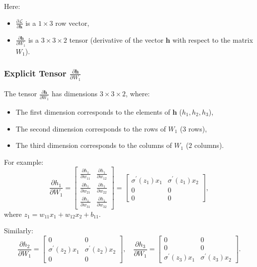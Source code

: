 \begin{notechapter}
Here:
\begin{itemize}
    \item \( \frac{\partial \mathcal{L}}{\partial \mathbf{h}} \) is a \( 1 \times 3 \) row vector,
    \item \( \frac{\partial \mathbf{h}}{\partial W_1} \) is a \( 3 \times 3 \times 2 \) tensor 
          (derivative of the vector \( \mathbf{h} \) with respect to the matrix \( W_1 \)).
\end{itemize}

\subsubsection{Explicit Tensor \( \frac{\partial \mathbf{h}}{\partial W_1} \)}

The tensor \( \frac{\partial \mathbf{h}}{\partial W_1} \) has dimensions \( 3 \times 3 \times 2 \), 
where:
\begin{itemize}
    \item The first dimension corresponds to the elements of \( \mathbf{h} \) (\( h_1, h_2, h_3 \)),
    \item The second dimension corresponds to the rows of \( W_1 \) (\( 3 \) rows),
    \item The third dimension corresponds to the columns of \( W_1 \) (\( 2 \) columns).
\end{itemize}

For example:
\[
\frac{\partial h_1}{\partial W_1} = \begin{bmatrix}
\frac{\partial h_1}{\partial w_{11}} & \frac{\partial h_1}{\partial w_{12}} \\
\frac{\partial h_1}{\partial w_{21}} & \frac{\partial h_1}{\partial w_{22}} \\
\frac{\partial h_1}{\partial w_{31}} & \frac{\partial h_1}{\partial w_{32}}
\end{bmatrix} = \begin{bmatrix}
\sigma^{\prime}(z_1) x_1 & \sigma^{\prime}(z_1) x_2 \\
0 & 0 \\
0 & 0
\end{bmatrix},
\]
where \( z_1 = w_{11}x_1 + w_{12}x_2 + b_{11} \).

Similarly:
\[
\frac{\partial h_2}{\partial W_1} = \begin{bmatrix}
0 & 0 \\
\sigma^{\prime}(z_2) x_1 & \sigma^{\prime}(z_2) x_2 \\
0 & 0
\end{bmatrix}, \quad
\frac{\partial h_3}{\partial W_1} = \begin{bmatrix}
0 & 0 \\
0 & 0 \\
\sigma^{\prime}(z_3) x_1 & \sigma^{\prime}(z_3) x_2
\end{bmatrix}.
\]


\end{notechapter}
